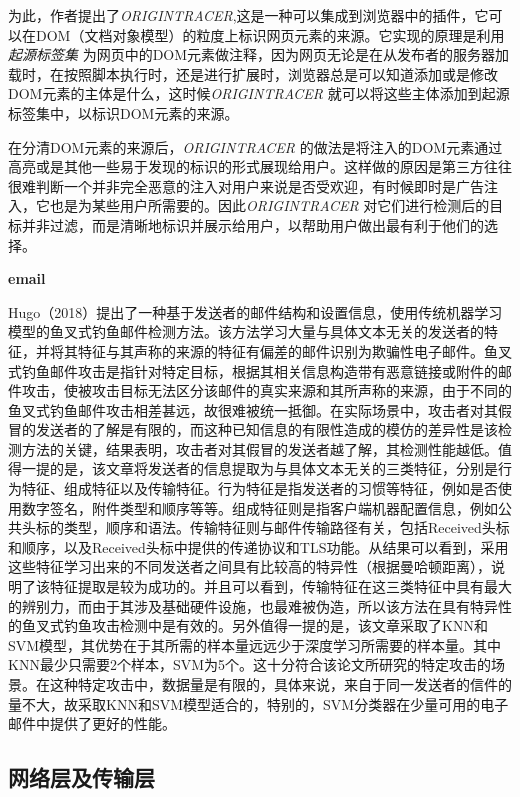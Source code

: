 \documentclass[11pt]{article} %
\begin{document}
为此，作者提出了\textit{ORIGINTRACER},这是一种可以集成到浏览器中的插件，它可以在DOM（文档对象模型）的粒度上标识网页元素的来源。它实现的原理是利用 \textit{起源标签集} 为网页中的DOM元素做注释，因为网页无论是在从发布者的服务器加载时，在按照脚本执行时，还是进行扩展时，浏览器总是可以知道添加或是修改DOM元素的主体是什么，这时候\textit{ORIGINTRACER} 就可以将这些主体添加到起源标签集中，以标识DOM元素的来源。

在分清DOM元素的来源后，\textit{ORIGINTRACER} 的做法是将注入的DOM元素通过高亮或是其他一些易于发现的标识的形式展现给用户。这样做的原因是第三方往往很难判断一个并非完全恶意的注入对用户来说是否受欢迎，有时候即时是广告注入，它也是为某些用户所需要的。因此\textit{ORIGINTRACER} 对它们进行检测后的目标并非过滤，而是清晰地标识并展示给用户，以帮助用户做出最有利于他们的选择。

\textbf{email}

Hugo（2018）提出了一种基于发送者的邮件结构和设置信息，使用传统机器学习模型的鱼叉式钓鱼邮件检测方法。该方法学习大量与具体文本无关的发送者的特征，并将其特征与其声称的来源的特征有偏差的邮件识别为欺骗性电子邮件。鱼叉式钓鱼邮件攻击是指针对特定目标，根据其相关信息构造带有恶意链接或附件的邮件攻击，使被攻击目标无法区分该邮件的真实来源和其所声称的来源，由于不同的鱼叉式钓鱼邮件攻击相差甚远，故很难被统一抵御。在实际场景中，攻击者对其假冒的发送者的了解是有限的，而这种已知信息的有限性造成的模仿的差异性是该检测方法的关键，结果表明，攻击者对其假冒的发送者越了解，其检测性能越低。值得一提的是，该文章将发送者的信息提取为与具体文本无关的三类特征，分别是行为特征、组成特征以及传输特征。行为特征是指发送者的习惯等特征，例如是否使用数字签名，附件类型和顺序等等。组成特征则是指客户端机器配置信息，例如公共头标的类型，顺序和语法。传输特征则与邮件传输路径有关，包括Received头标和顺序，以及Received头标中提供的传递协议和TLS功能。从结果可以看到，采用这些特征学习出来的不同发送者之间具有比较高的特异性（根据曼哈顿距离），说明了该特征提取是较为成功的。并且可以看到，传输特征在这三类特征中具有最大的辨别力，而由于其涉及基础硬件设施，也最难被伪造，所以该方法在具有特异性的鱼叉式钓鱼攻击检测中是有效的。另外值得一提的是，该文章采取了KNN和SVM模型，其优势在于其所需的样本量远远少于深度学习所需要的样本量。其中KNN最少只需要2个样本，SVM为5个。这十分符合该论文所研究的特定攻击的场景。在这种特定攻击中，数据量是有限的，具体来说，来自于同一发送者的信件的量不大，故采取KNN和SVM模型适合的，特别的，SVM分类器在少量可用的电子邮件中提供了更好的性能。

\subsection{网络层及传输层}
\label{ip}
\end{document}
